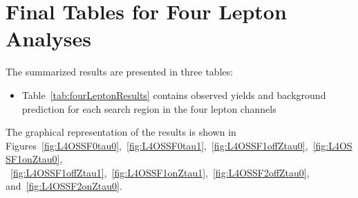 \section{Final Tables for Four Lepton Analyses}
The summarized results are presented in three tables: 
\begin{itemize}
\item Table~\ref{tab:fourLeptonResults} contains observed yields  and background prediction 
for each search region in the four lepton channels
\end{itemize}

The graphical representation of the results is shown in 
Figures~\ref{fig:L4OSSF0tau0},~\ref{fig:L4OSSF0tau1},~\ref{fig:L4OSSF1offZtau0},~\ref{fig:L4OSSF1onZtau0},
~\ref{fig:L4OSSF1offZtau1},~\ref{fig:L4OSSF1onZtau1},~\ref{fig:L4OSSF2offZtau0}, and~\ref{fig:L4OSSF2onZtau0}.

